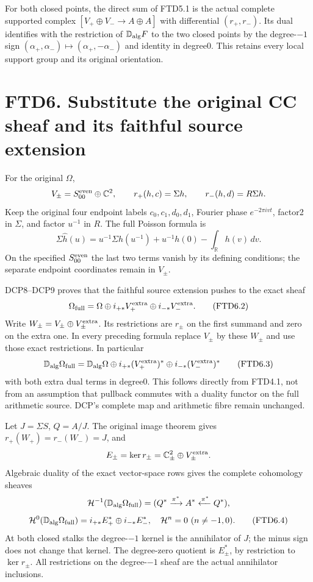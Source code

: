 For both closed points, the direct sum of FTD5.1 is the actual complete
supported complex \([V_+\oplus V_-\to A\oplus A]\) with differential
\((r_+,r_-)\). Its dual identifies with the restriction of
\(\mathbb D_{\rm alg}F\) to the two closed points by the degree-\(-1\)
sign \((\alpha_+,\alpha_-)\mapsto(\alpha_+,-\alpha_-)\) and identity in
degree0. This retains every local support group and its original
orientation.

\section{FTD6. Substitute the original CC sheaf and its faithful source
extension}\label{ftd6.-substitute-the-original-cc-sheaf-and-its-faithful-source-extension}

For the original \(\Omega\), \[
V_\pm=S_{00}^{\rm even}\oplus\mathbb C^2,\qquad
r_+(h,c)=\Sigma h,\qquad r_-(h,d)=R\Sigma h.
\] Keep the original four endpoint labels \(c_0,c_1,d_0,d_1\), Fourier
phase \(e^{-2\pi ivt}\), factor2 in \(\Sigma\), and factor \(u^{-1}\) in
\(R\). The full Poisson formula is \[
\Sigma\widehat h(u)=u^{-1}\Sigma h(u^{-1})
+u^{-1}h(0)-\int_{\mathbb R}h(v)\,dv.
\tag{FTD6.1}
\] On the specified \(S_{00}^{\rm even}\) the last two terms vanish by
its defining conditions; the separate endpoint coordinates remain in
\(V_\pm\).

DCP8--DCP9 proves that the faithful source extension pushes to the exact
sheaf \[
\Omega_{\rm full}
=\Omega\oplus i_{+*}V_+^{\rm extra}\oplus i_{-*}V_-^{\rm extra}.
\tag{FTD6.2}
\] Write \(W_\pm=V_\pm\oplus V_\pm^{\rm extra}\). Its restrictions are
\(r_\pm\) on the first summand and zero on the extra one. In every
preceding formula replace \(V_\pm\) by these \(W_\pm\) and use those
exact restrictions. In particular \[
\mathbb D_{\rm alg}\Omega_{\rm full}
=\mathbb D_{\rm alg}\Omega
\oplus i_{+*}(V_+^{\rm extra})^*
\oplus i_{-*}(V_-^{\rm extra})^*
\tag{FTD6.3}
\] with both extra dual terms in degree0. This follows directly from
FTD4.1, not from an assumption that pullback commutes with a duality
functor on the full arithmetic source. DCP's complete map and arithmetic
fibre remain unchanged.

Let \(J=\Sigma S\), \(Q=A/J\). The original image theorem gives
\(r_+(W_+)=r_-(W_-)=J\), and \[
E_\pm=\ker r_\pm=\mathbb C^2_{\pm}\oplus V_\pm^{\rm extra}.
\] Algebraic duality of the exact vector-space rows gives the complete
cohomology sheaves \[
\mathcal H^{-1}(\mathbb D_{\rm alg}\Omega_{\rm full})
=(Q^*\xrightarrow{\pi^*}A^*\xleftarrow{\pi^*}Q^*),
\] \[
\mathcal H^0(\mathbb D_{\rm alg}\Omega_{\rm full})
=i_{+*}E_+^*\oplus i_{-*}E_-^*,
\quad \mathcal H^n=0\ (n\ne-1,0).
\tag{FTD6.4}
\] At both closed stalks the degree-\(-1\) kernel is the annihilator of
\(J\); the minus sign does not change that kernel. The degree-zero
quotient is \(E_\pm^*\), by restriction to \(\ker r_\pm\). All
restrictions on the degree-\(-1\) sheaf are the actual annihilator
inclusions.

